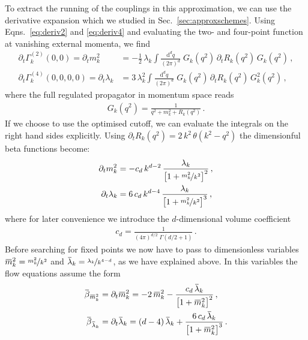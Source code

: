\documentclass[11pt]{book}
\newcommand{\overbar}[1]{\mkern 1.5mu\overline{\mkern-1.5mu#1\mkern-1.5mu}\mkern 1.5mu}
\numberwithin{equation}{chapter}
\begin{document}
To extract the running of the couplings in this approximation,
we can use the derivative expansion which we studied in
Sec.~\ref{sec:approxschemes}. Using Eqns.~\eqref{eq:deriv2} and \eqref{eq:deriv4}
and evaluating the two- and four-point function at
vanishing external momenta, we find
\begin{align}
  \partial_t \Gamma^{(2)}_k(0,0) =
  \partial_t m_k^2 &=
  - \frac 12 \, \lambda_k \int \frac{ \mathrm d^dq }{ (2\pi)^d } \;
  G_k(q^2) \, \partial_t R_k(q^2) \, G_k(q^2) \,, \\
  \partial_t \Gamma^{(4)}_k(0,0,0,0) =
  \partial_t \lambda_k &=
  3 \, \lambda_k^2 \int \frac{ \mathrm d^dq }{ (2\pi)^d } \;
  G_k(q^2) \, \partial_t R_k(q^2) \, G_k^2(q^2) \,,
\end{align}
where the full regulated propagator in momentum space reads
\begin{align}
  G_k(q^2) = \frac 1 { q^2 + m_k^2 + R_k(q^2) } \,.
\end{align}
If we choose to use the optimised cutoff, we can evaluate the
integrals on the right hand sides explicitly. Using
$\partial_t R_k(q^2) = 2 \, k^2 \, \theta(k^2 - q^2)$
the dimensionful beta functions become:
\begin{align}
  \partial_t m_k^2 &=
  - c_d \, k^{d-2} \,
  \frac{ \lambda_k }{ \big[ 1 + \nicefrac{m_k^2}{k^2} \big] ^2 } \,, \\
  \partial_t \lambda_k &=
  6 \, c_d \, k^{d-4} \,
  \frac{ \lambda_k }{ \big[ 1 + \nicefrac{m_k^2}{k^2} \big] ^3 } \,,
\end{align}
where for later convenience we introduce the $d$-dimensional
volume coefficient
\begin{align}
  c_d = \frac{ 1 }{ (4\pi)^{d/2} \; \Gamma(d/2+1) } \,.
\end{align}
Before searching for fixed points we now have to pass to
dimensionless variables
$\overbar m_k^2 = \nicefrac{ m_k^2 }{ k^2 }$ and
$\overbar \lambda_k = \nicefrac{ \lambda_k }{ k^{4-d} }$, as we have
explained above. In this variables the flow equations
assume the form
\begin{align}
  \overbar \beta_{ \overbar m_k^2 } &=
  \partial_t \overbar m_k^2 =
  - 2 \, \overbar m_k^2
  - \frac{ c_d \, \overbar \lambda_k }{ \big[ 1 + \overbar m_k^2 \big] ^2 } \,, \\
  \overbar \beta_{ \overbar \lambda_k } &=
  \partial_t \overbar \lambda_k =
  (d-4) \, \overbar \lambda_k
  + \frac{ 6 \, c_d \,\overbar \lambda_k }{ \big[ 1 + \overbar m_k^2 \big] ^3 } \,.
\end{align}
\end{document}
